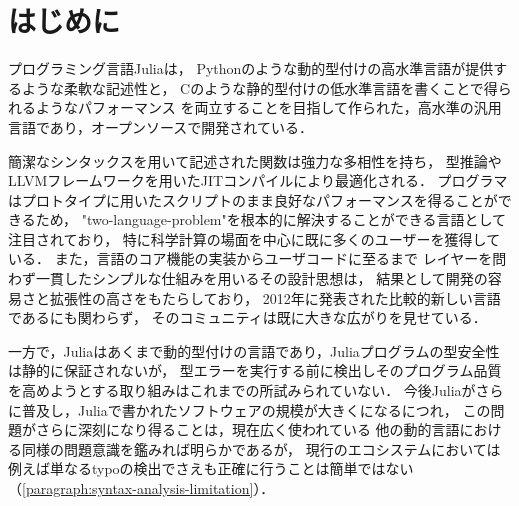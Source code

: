 
\section{はじめに}

プログラミング言語Julia\cite{julia}は，
Pythonのような動的型付けの高水準言語が提供するような柔軟な記述性と，
Cのような静的型付けの低水準言語を書くことで得られるようなパフォーマンス
を両立することを目指して作られた，高水準の汎用言語であり，オープンソースで開発されている．

簡潔なシンタックスを用いて記述された関数は強力な多相性を持ち，
型推論やLLVMフレームワークを用いたJITコンパイルにより最適化される．
プログラマはプロトタイプに用いたスクリプトのまま良好なパフォーマンスを得ることができるため，
"two-language-problem"\footnotemark を根本的に解決することができる言語として注目されており，
特に科学計算の場面を中心に既に多くのユーザーを獲得している\cite{julia-growth}．
また，言語のコア機能の実装からユーザコードに至るまで
レイヤーを問わず一貫したシンプルな仕組みを用いるその設計思想は，
結果として開発の容易さと拡張性の高さをもたらしており，
2012年に発表された比較的新しい言語であるにも関わらず，
そのコミュニティは既に大きな広がりを見せている．


一方で，Juliaはあくまで動的型付けの言語であり，Juliaプログラムの型安全性は静的に保証されないが，
型エラーを実行する前に検出しそのプログラム品質を高めようとする取り組みはこれまでの所試みられていない．
今後Juliaがさらに普及し，Juliaで書かれたソフトウェアの規模が大きくになるにつれ，
この問題がさらに深刻になり得ることは，現在広く使われている
他の動的言語における同様の問題意識を鑑みれば明らかであるが\cite{ruby-progress-report}，
現行のエコシステムにおいては例えば単なるtypoの検出でさえも正確に行うことは簡単ではない（\ref{paragraph:syntax-analysis-limitation}）．

